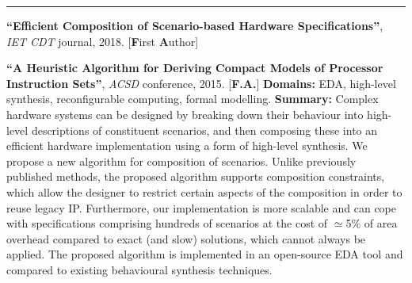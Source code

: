 \vspace{-3mm}
\rule{\textwidth}{0.5pt}\vspace{-1mm}

\begin{cventries}
\vspace{-4mm}

\cventry
{} %
{} %
{} %
{} %
{ %
\begin{cvitems}
\item{\textbf{``Efficient Composition of Scenario-based Hardware 
Specifications''}, 
\textit{IET CDT} journal, 2018. [\textbf{F}irst \textbf{A}uthor]}
\item{\textbf{``A Heuristic Algorithm for Deriving Compact Models of Processor 
Instruction Sets''}, \textit{ACSD} conference, 2015. 
[\textbf{F.}\textbf{A.}]\newline}
\textbf{Domains:} EDA, high-level synthesis, reconfigurable 
computing, formal modelling.\newline
\textbf{Summary:} Complex hardware systems can be designed by breaking down
their behaviour into high-level descriptions of constituent scenarios, and then
composing these into an efficient hardware implementation using a form
of high-level synthesis. We propose a new algorithm for composition of
scenarios. Unlike previously published methods, the proposed algorithm supports
composition constraints, which allow the designer to restrict certain aspects of
the composition in order to reuse legacy IP. Furthermore, our implementation is
more scalable and can cope with specifications comprising hundreds of scenarios
at the cost of $\simeq$5\% of area overhead compared to exact (and slow) 
solutions, which cannot always be applied. The proposed algorithm is 
implemented in an open-source EDA tool and compared to existing behavioural 
synthesis techniques.
\end{cvitems}
}


\end{cventries}

